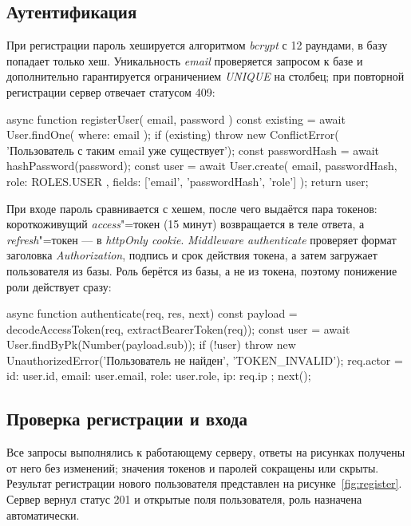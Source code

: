 \documentclass{stp}
\newcommand{\en}[1]{\textit{#1}}
\begin{document}
\subsection{Аутентификация}

При регистрации пароль хешируется алгоритмом \en{bcrypt} с 12 раундами, в
базу попадает только хеш. Уникальность \en{email} проверяется запросом к
базе и дополнительно гарантируется ограничением \en{UNIQUE} на столбец;
при повторной регистрации сервер отвечает статусом 409:

\begin{stplisting}
async function registerUser({ email, password }) {
  const existing = await User.findOne({ where: { email } });
  if (existing) {
    throw new ConflictError(
      'Пользователь с таким email уже существует');
  }
  const passwordHash = await hashPassword(password);
  const user = await User.create(
    { email, passwordHash, role: ROLES.USER },
    { fields: ['email', 'passwordHash', 'role'] });
  return user;
}
\end{stplisting}

При входе пароль сравнивается с хешем, после чего выдаётся пара токенов:
короткоживущий \en{access}"=токен (15 минут) возвращается в теле ответа, а
\en{refresh}"=токен --- в \en{httpOnly cookie}. \en{Middleware authenticate}
проверяет формат заголовка \en{Authorization}, подпись и срок действия
токена, а затем загружает пользователя из базы. Роль берётся из базы, а не
из токена, поэтому понижение роли действует сразу:

\begin{stplisting}
async function authenticate(req, res, next) {
  const payload = decodeAccessToken(req,
    extractBearerToken(req));
  const user = await User.findByPk(Number(payload.sub));
  if (!user) {
    throw new UnauthorizedError('Пользователь не найден',
      'TOKEN_INVALID');
  }
  req.actor = { id: user.id, email: user.email,
    role: user.role, ip: req.ip };
  next();
}
\end{stplisting}

\subsection{Проверка регистрации и входа}

Все запросы выполнялись к работающему серверу, ответы на рисунках
получены от него без изменений; значения токенов и паролей сокращены или
скрыты. Результат регистрации нового пользователя представлен на
рисунке~\ref{fig:register}. Сервер вернул статус 201 и открытые поля
пользователя, роль назначена автоматически.
\end{document}
